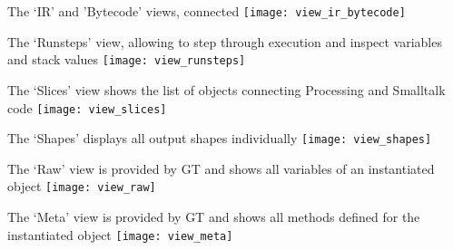 \begin{cfigure}{The `\ac{IR}' and 'Bytecode' views, connected}
\texttt{[image: view\_ir\_bytecode]}
\end{cfigure}

\begin{cfigure}{The `Runsteps' view, allowing to step through execution and inspect variables and stack values}
\texttt{[image: view\_runsteps]}
\end{cfigure}

\begin{cfigure}{The `Slices' view shows the list of objects connecting Processing and Smalltalk code}
\texttt{[image: view\_slices]}
\end{cfigure}

\begin{cfigure}{The `Shapes' displays all output shapes individually}
\texttt{[image: view\_shapes]}
\end{cfigure}

\begin{cfigure}{The `Raw' view is provided by \ac{GT} and shows all variables of an instantiated object}
\texttt{[image: view\_raw]}
\end{cfigure}

\begin{cfigure}{The `Meta' view is provided by \ac{GT} and shows all methods defined for the instantiated object}
\texttt{[image: view\_meta]}
\end{cfigure}

